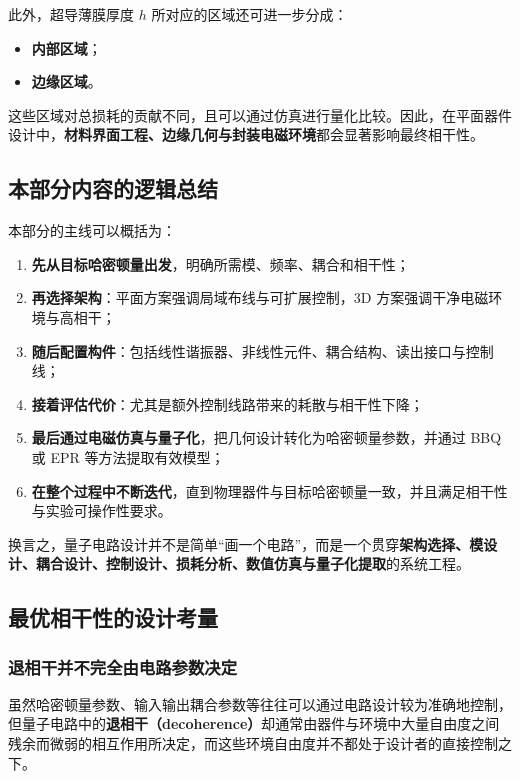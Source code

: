 \documentclass[12pt,a4paper,oneside]{ctexbook}
\begin{document}
此外，超导薄膜厚度 \(h\) 所对应的区域还可进一步分成：
\begin{itemize}
    \item \textbf{内部区域}；
    \item \textbf{边缘区域}。
\end{itemize}

这些区域对总损耗的贡献不同，且可以通过仿真进行量化比较。因此，在平面器件设计中，\textbf{材料界面工程、边缘几何与封装电磁环境}都会显著影响最终相干性。

\subsection{本部分内容的逻辑总结}

本部分的主线可以概括为：

\begin{enumerate}
    \item \textbf{先从目标哈密顿量出发}，明确所需模、频率、耦合和相干性；
    \item \textbf{再选择架构}：平面方案强调局域布线与可扩展控制，3D 方案强调干净电磁环境与高相干；
    \item \textbf{随后配置构件}：包括线性谐振器、非线性元件、耦合结构、读出接口与控制线；
    \item \textbf{接着评估代价}：尤其是额外控制线路带来的耗散与相干性下降；
    \item \textbf{最后通过电磁仿真与量子化}，把几何设计转化为哈密顿量参数，并通过 BBQ 或 EPR 等方法提取有效模型；
    \item \textbf{在整个过程中不断迭代}，直到物理器件与目标哈密顿量一致，并且满足相干性与实验可操作性要求。
\end{enumerate}

换言之，量子电路设计并不是简单“画一个电路”，而是一个贯穿\textbf{架构选择、模设计、耦合设计、控制设计、损耗分析、数值仿真与量子化提取}的系统工程。
\subsection{最优相干性的设计考量}

\subsubsection{退相干并不完全由电路参数决定}

虽然哈密顿量参数、输入输出耦合参数等往往可以通过电路设计较为准确地控制，但量子电路中的\textbf{退相干（decoherence）}却通常由器件与环境中大量自由度之间残余而微弱的相互作用所决定，而这些环境自由度并不都处于设计者的直接控制之下。
\end{document}
